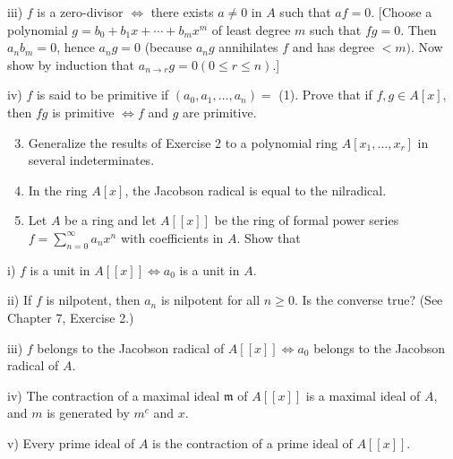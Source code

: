 \documentclass{standalone}
\theoremstyle{definition}
\theoremstyle{remark}
\begin{document}
iii) $f$ is a zero-divisor $\Leftrightarrow$ there exists $a \neq 0$ in $A$ such that $a f=0$. [Choose a polynomial $g=b_{0}+b_{1} x+\cdots+b_{m} x^{m}$ of least degree $m$ such that $f g=0$. Then $a_{n} b_{m}=0$, hence $a_{n} g=0$ (because $a_{n} g$ annihilates $f$ and has degree $<m)$. Now show by induction that $a_{n \rightarrow r} g=0(0 \leqslant r \leqslant n)$.]

iv) $f$ is said to be primitive if $\left(a_{0}, a_{1}, \ldots, a_{n}\right)=$ (1). Prove that if $f, g \in A[x]$, then $f g$ is primitive $\Leftrightarrow f$ and $g$ are primitive.

\begin{enumerate}
  \setcounter{enumi}{2}
  \item Generalize the results of Exercise 2 to a polynomial ring $A\left[x_{1}, \ldots, x_{r}\right]$ in several indeterminates.

  \item In the ring $A[x]$, the Jacobson radical is equal to the nilradical.

  \item Let $A$ be a ring and let $A[[x]]$ be the ring of formal power series $f=\sum_{n=0}^{\infty} a_{n} x^{n}$ with coefficients in $A$. Show that

\end{enumerate}

i) $f$ is a unit in $A[[x]] \Leftrightarrow a_{0}$ is a unit in $A$.

ii) If $f$ is nilpotent, then $a_{n}$ is nilpotent for all $n \geqslant 0$. Is the converse true? (See Chapter 7, Exercise 2.)

iii) $f$ belongs to the Jacobson radical of $A[[x]] \Leftrightarrow a_{0}$ belongs to the Jacobson radical of $A$.

iv) The contraction of a maximal ideal $\mathfrak{m}$ of $A[[x]]$ is a maximal ideal of $A$, and $m$ is generated by $m^{c}$ and $x$.

v) Every prime ideal of $A$ is the contraction of a prime ideal of $A[[x]]$.
\end{document}
